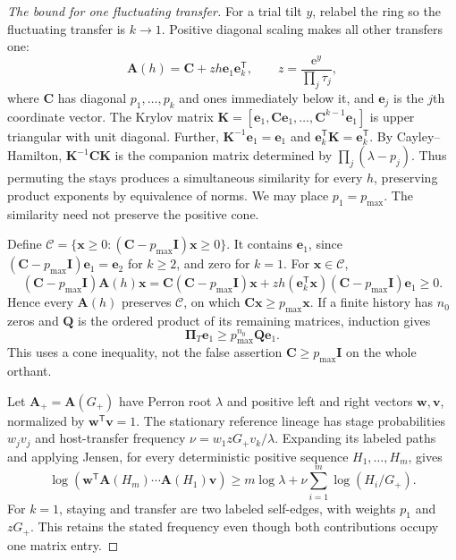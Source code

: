 \begin{proof}[The bound for one fluctuating transfer]
For a trial tilt \(y\), relabel the ring so the fluctuating transfer is \(k\to1\). Positive diagonal scaling makes all other transfers one:
\begin{equation}\label{eq:mech-outage-ring}
 \mathbf A(h)=\mathbf C+z h\mathbf e_1\mathbf e_k^{\mathsf T},\qquad
 z=\frac{\mathrm e^y}{\prod_j\tau_j},
\end{equation}
where \(\mathbf C\) has diagonal \(p_1,\ldots,p_k\) and ones immediately below it, and \(\mathbf e_j\) is the \(j\)th coordinate vector. The Krylov matrix
\(\mathbf K=[\mathbf e_1,\mathbf C\mathbf e_1,\ldots,\mathbf C^{k-1}\mathbf e_1]\) is upper triangular with unit diagonal. Further,
\(\mathbf K^{-1}\mathbf e_1=\mathbf e_1\) and
\(\mathbf e_k^{\mathsf T}\mathbf K=\mathbf e_k^{\mathsf T}\).
By Cayley--Hamilton, \(\mathbf K^{-1}\mathbf C\mathbf K\) is the companion matrix determined by \(\prod_j(\lambda-p_j)\). Thus permuting the stays produces a simultaneous similarity for every \(h\), preserving product exponents by equivalence of norms. We may place \(p_1=p_{\max}\). The similarity need not preserve the positive cone.

Define \(\mathcal C=\{\mathbf x\geq0:(\mathbf C-p_{\max}\mathbf I)\mathbf x\geq0\}\).
It contains \(\mathbf e_1\), since \((\mathbf C-p_{\max}\mathbf I)\mathbf e_1=\mathbf e_2\) for \(k\geq2\), and zero for \(k=1\). For \(\mathbf x\in\mathcal C\),
\begin{equation}\label{eq:mech-outage-cone}
 (\mathbf C-p_{\max}\mathbf I)\mathbf A(h)\mathbf x
 =\mathbf C(\mathbf C-p_{\max}\mathbf I)\mathbf x
 +zh(\mathbf e_k^{\mathsf T}\mathbf x)(\mathbf C-p_{\max}\mathbf I)\mathbf e_1\geq0.
\end{equation}
Hence every \(\mathbf A(h)\) preserves \(\mathcal C\), on which \(\mathbf C\mathbf x\geq p_{\max}\mathbf x\). If a finite history has \(n_0\) zeros and \(\mathbf Q\) is the ordered product of its remaining matrices, induction gives
\begin{equation}\label{eq:mech-outage-delete}
 \mathbf\Pi_T\mathbf e_1\geq p_{\max}^{n_0}\mathbf Q\mathbf e_1.
\end{equation}
This uses a cone inequality, not the false assertion \(\mathbf C\geq p_{\max}\mathbf I\) on the whole orthant.

Let \(\mathbf A_+=\mathbf A(G_+)\) have Perron root \(\lambda\) and positive left and right vectors \(\mathbf w,\mathbf v\), normalized by \(\mathbf w^{\mathsf T}\mathbf v=1\). The stationary reference lineage has stage probabilities \(w_jv_j\) and host-transfer frequency \(\nu=w_1zG_+v_k/\lambda\). Expanding its labeled paths and applying Jensen, for every deterministic positive sequence \(H_1,\ldots,H_m\), gives
\begin{equation}\label{eq:mech-outage-jensen}
 \log(\mathbf w^{\mathsf T}\mathbf A(H_m)\cdots\mathbf A(H_1)\mathbf v)
 \geq m\log\lambda+\nu\sum_{i=1}^m\log(H_i/G_+).
\end{equation}
For \(k=1\), staying and transfer are two labeled self-edges, with weights \(p_1\) and \(zG_+\). This retains the stated frequency even though both contributions occupy one matrix entry.


\end{proof}
